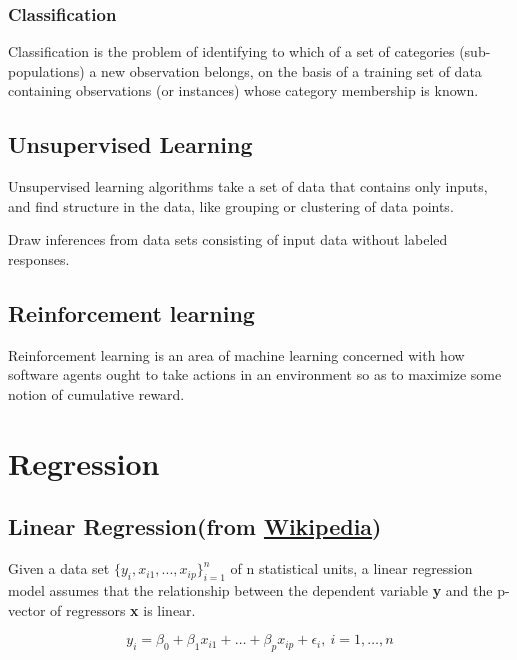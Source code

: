 \documentclass{article}
\begin{document}
\subsubsection{Classification}

Classification is the problem of identifying to which 
of a set of categories (sub-populations) a new observation 
belongs, on the basis of a training set of data containing 
observations (or instances) whose category membership is known.

\subsection{Unsupervised Learning}

Unsupervised learning algorithms take a set of data that 
contains only inputs, and find structure in the data, like 
grouping or clustering of data points.

\bigskip

\noindent Draw inferences from data sets consisting of input 
data without labeled responses.

\subsection{Reinforcement learning}
       
Reinforcement learning is an area of machine learning concerned 
with how software agents ought to take actions in an environment 
so as to maximize some notion of cumulative reward.

\section{Regression}

\subsection{Linear Regression(from \href{https://en.wikipedia.org/wiki/Linear_regression\#:~:text=In\%20statistics\%2C\%20linear\%20regression\%20is,is\%20called\%20simple\%20linear\%20regression.}{Wikipedia})}

Given a data set \(\{y_i, x_{i1}, ..., x_{ip}\}_{i=1}^n\) of n statistical units, a linear regression model assumes that the relationship between the dependent variable \textbf{y} and the p-vector of regressors \textbf{x} is linear.

\[y_i = \beta_0 + \beta_{1}x_{i1} + \dots + \beta_{p}x_{ip} + \epsilon_i, \: i = 1, \dots, n\]
\end{document}
